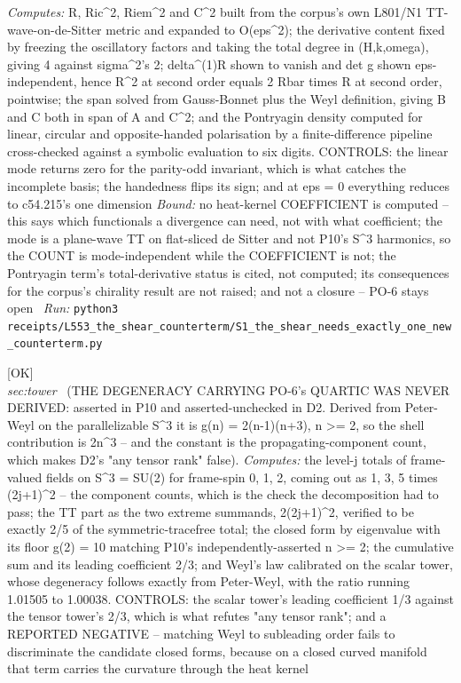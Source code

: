 \begin{description}
\emph{Computes:} R, Ric\textasciicircum{}2, Riem\textasciicircum{}2 and C\textasciicircum{}2 built from the corpus's own L801/N1 TT-wave-on-de-Sitter metric and expanded to O(eps\textasciicircum{}2); the derivative content fixed by freezing the oscillatory factors and taking the total degree in (H,k,omega), giving 4 against sigma\textasciicircum{}2's 2; delta\textasciicircum{}(1)R shown to vanish and det g shown eps-independent, hence R\textasciicircum{}2 at second order equals 2 Rbar times R at second order, pointwise; the span solved from Gauss-Bonnet plus the Weyl definition, giving B and C both in span of A and C\textasciicircum{}2; and the Pontryagin density computed for linear, circular and opposite-handed polarisation by a finite-difference pipeline cross-checked against a symbolic evaluation to six digits. CONTROLS: the linear mode returns zero for the parity-odd invariant, which is what catches the incomplete basis; the handedness flips its sign; and at eps = 0 everything reduces to c54.215's one dimension
 \emph{Bound:} no heat-kernel COEFFICIENT is computed -- this says which functionals a divergence can need, not with what coefficient; the mode is a plane-wave TT on flat-sliced de Sitter and not P10's S\textasciicircum{}3 harmonics, so the COUNT is mode-independent while the COEFFICIENT is not; the Pontryagin term's total-derivative status is cited, not computed; its consequences for the corpus's chirality result are not raised; and not a closure -- PO-6 stays open
\ \emph{Run:} \texttt{python3 receipts/L553\_the\_shear\_counterterm/S1\_the\_shear\_needs\_exactly\_one\_new\_counterterm.py}
\item[\label{rcpt:D1_the_degeneracy_carrying_the_quartic_was_never_derived_and_its_constant_is_the_component_count}\textbf{}\quad\texttt{D1\_the\_degeneracy\_carrying\_the\_quartic\_was\_never\_derived\_and\_its\_constant\_is\_the\_component\_count}]\hfill\textsf{[OK]}\\
\textit{sec:tower} \ (THE DEGENERACY CARRYING PO-6's QUARTIC WAS NEVER DERIVED: asserted in P10 and asserted-unchecked in D2. Derived from Peter-Weyl on the parallelizable S\textasciicircum{}3 it is g(n) = 2(n-1)(n+3), n >= 2, so the shell contribution is 2n\textasciicircum{}3 -- and the constant is the propagating-component count, which makes D2's "any tensor rank" false). 
\emph{Computes:} the level-j totals of frame-valued fields on S\textasciicircum{}3 = SU(2) for frame-spin 0, 1, 2, coming out as 1, 3, 5 times (2j+1)\textasciicircum{}2 -- the component counts, which is the check the decomposition had to pass; the TT part as the two extreme summands, 2(2j+1)\textasciicircum{}2, verified to be exactly 2/5 of the symmetric-tracefree total; the closed form by eigenvalue with its floor g(2) = 10 matching P10's independently-asserted n >= 2; the cumulative sum and its leading coefficient 2/3; and Weyl's law calibrated on the scalar tower, whose degeneracy follows exactly from Peter-Weyl, with the ratio running 1.01505 to 1.00038. CONTROLS: the scalar tower's leading coefficient 1/3 against the tensor tower's 2/3, which is what refutes "any tensor rank"; and a REPORTED NEGATIVE -- matching Weyl to subleading order fails to discriminate the candidate closed forms, because on a closed curved manifold that term carries the curvature through the heat kernel

\end{description}
